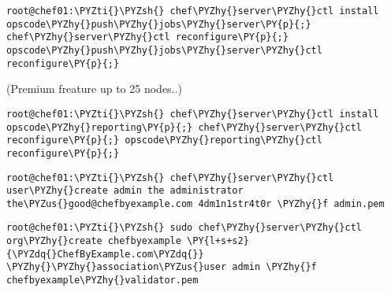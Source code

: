 
\begin{codelisting}
\label{code:}
\codecaption{}
\begin{Verbatim}[fontsize=\relsize{-2.5},fontseries=b,commandchars=\\\{\}]
root@chef01:\PYZti{}\PYZsh{} chef\PYZhy{}server\PYZhy{}ctl install opscode\PYZhy{}push\PYZhy{}jobs\PYZhy{}server\PY{p}{;} chef\PYZhy{}server\PYZhy{}ctl reconfigure\PY{p}{;} opscode\PYZhy{}push\PYZhy{}jobs\PYZhy{}server\PYZhy{}ctl reconfigure\PY{p}{;}
\end{Verbatim}
\end{codelisting}


(Premium freature up to 25 nodes..)
\begin{codelisting}
\label{code:}
\codecaption{}
\begin{Verbatim}[fontsize=\relsize{-2.5},fontseries=b,commandchars=\\\{\}]
root@chef01:\PYZti{}\PYZsh{} chef\PYZhy{}server\PYZhy{}ctl install opscode\PYZhy{}reporting\PY{p}{;} chef\PYZhy{}server\PYZhy{}ctl reconfigure\PY{p}{;} opscode\PYZhy{}reporting\PYZhy{}ctl reconfigure\PY{p}{;} 
\end{Verbatim}
\end{codelisting}


\begin{codelisting}
\label{code:}
\codecaption{}
\begin{Verbatim}[fontsize=\relsize{-2.5},fontseries=b,commandchars=\\\{\}]
root@chef01:\PYZti{}\PYZsh{} chef\PYZhy{}server\PYZhy{}ctl user\PYZhy{}create admin the administrator the\PYZus{}good@chefbyexample.com 4dm1n1str4t0r \PYZhy{}f admin.pem
\end{Verbatim}
\end{codelisting}


\begin{codelisting}
\label{code:}
\codecaption{}
\begin{Verbatim}[fontsize=\relsize{-2.5},fontseries=b,commandchars=\\\{\}]
root@chef01:\PYZti{}\PYZsh{} sudo chef\PYZhy{}server\PYZhy{}ctl org\PYZhy{}create chefbyexample \PY{l+s+s2}{\PYZdq{}ChefByExample.com\PYZdq{}} \PYZhy{}\PYZhy{}association\PYZus{}user admin \PYZhy{}f chefbyexample\PYZhy{}validator.pem
\end{Verbatim}
\end{codelisting}

